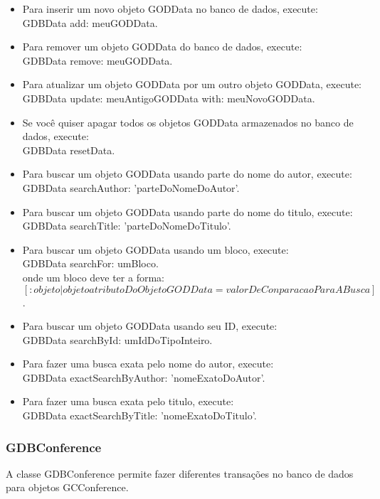 \begin{itemize}
\item Para inserir um novo objeto GODData no banco de dados, execute:\\
{ GDBData add: meuGODData.}
\item Para remover um objeto GODData do banco de dados, execute:\\
{ GDBData remove: meuGODData.}
\item Para atualizar um objeto GODData por um outro objeto GODData, execute:\\
{ GDBData update: meuAntigoGODData with: meuNovoGODData.}
\item Se você quiser apagar todos os objetos GODData armazenados no banco de dados, execute:\\
{GDBData resetData.}

\item Para buscar um objeto GODData usando parte do nome do autor, execute:\\
{ GDBData searchAuthor: 'parteDoNomeDoAutor'.}
\item Para buscar um objeto GODData usando parte do nome do titulo, execute:\\
{ GDBData searchTitle: 'parteDoNomeDoTitulo'.}
\item Para buscar um objeto GODData usando um bloco, execute:\\
{ GDBData searchFor: umBloco.}\\
onde um bloco deve ter a forma:\\
$[:objeto | objeto atributoDoObjetoGODData = valorDeConparacaoParaABusca]$.

\item Para buscar um objeto GODData usando seu ID, execute:\\
{ GDBData searchById: umIdDoTipoInteiro.}
\item Para fazer uma busca exata pelo nome do autor, execute:\\
{ GDBData exactSearchByAuthor: 'nomeExatoDoAutor'.}
\item Para fazer uma busca exata pelo titulo, execute:\\
{ GDBData exactSearchByTitle: 'nomeExatoDoTitulo'.}	

\end{itemize}


\subsubsection{GDBConference}
A classe GDBConference permite fazer diferentes transações no banco de dados para objetos GCConference. 

